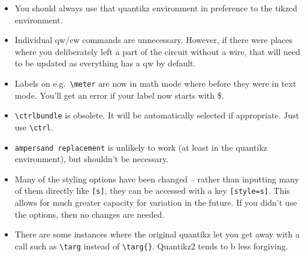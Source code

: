 \documentclass[aps,pra,10pt,nofootinbib]{revtex4-2}
\begin{document}
\begin{itemize}
  \item You should always use that quantikz environment in preference to the tikzcd environment.
  \item Individual qw/cw commands are unnecessary. However, if there were places where you deliberately left a part of the circuit without a wire, that will need to be updated as everything has a qw by default.
  \item Labels on e.g.\ \verb!\meter! are now in math mode where before they were in text mode. You'll get an error if your label now starts with \$.
  \item \verb!\ctrlbundle! is obsolete. It will be automatically selected if appropriate. Just use \verb!\ctrl!.
  \item \texttt{ampersand replacement} is unlikely to work (at least in the quantikz environment), but shouldn't be necessary.
  \item Many of the styling options have been changed -- rather than inputting many of them directly like \verb![s]!, they can be accessed with a key \verb![style=s]!. This allows for much greater capacity for variation in the future. If you didn't use the options, then no changes are needed.
  \item There are some instances where the original quantikz let you get away with a call such as \verb!\targ! instead of \verb!\targ{}!. Quantikz2 tends to b less forgiving.
\end{itemize}


\end{document}
